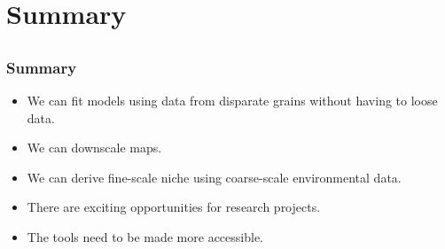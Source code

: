 \documentclass[xcolor=x11names, compress]{beamer}
\renewcommand{\(}{\begin{columns}}
\renewcommand{\)}{\end{columns}}
\newcommand{\<}[1]{\begin{column}{#1}}
\renewcommand{\>}{\end{column}}
\begin{document}
\section{Summary}
\subsection{}

\begin{frame}
\frametitle{Summary}
\begin{itemize}[<+(1)->]
\item We can fit models using data from disparate grains without having to loose data.
\item We can downscale maps.
\item We can derive fine-scale niche using coarse-scale environmental data.
\item There are exciting opportunities for research projects.
\item The tools need to be made more accessible.
\end{itemize}
\end{frame}

\end{document}
